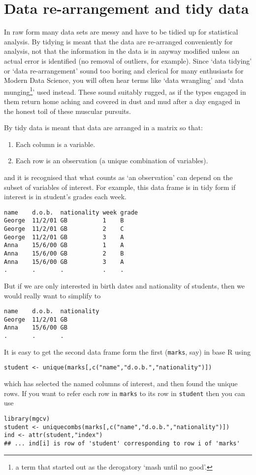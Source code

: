 \documentclass[10pt] {article}
\theoremstyle{definition}
\begin{document}
\section{Data re-arrangement and tidy data}

In raw form many data sets are messy and have to be tidied up for statistical analysis. By tidying is meant that the data are re-arranged conveniently for analysis, not that the information in the data is in anyway modified unless an actual error is identified (no removal of outliers, for example). Since `data tidying' or `data re-arrangement' sound too boring and clerical for many enthusiasts for Modern Data Science, you will often hear terms like `data wrangling' and `data munging\footnote{a term that started out as the derogatory `mash until no good'.}' used instead. These sound suitably rugged, as if the types engaged in them return home aching and covered in dust and mud after a day engaged in the honest toil of these muscular pursuits.

By tidy data is meant that data are arranged in a matrix so that:
\begin{enumerate}
\item Each column is a variable.
\item Each row is an observation (a unique combination of variables).
\end{enumerate}
and it is recognised that what counts as `an observation' can depend on the subset of variables of interest. For example,
this data frame is in tidy form if interest is in student's grades each week. 
\begin{verbatim}
name    d.o.b.  nationality week grade
George  11/2/01 GB          1    B
George  11/2/01 GB          2    C
George  11/2/01 GB          3    A
Anna    15/6/00 GB          1    A
Anna    15/6/00 GB          2    B
Anna    15/6/00 GB          3    A
.       .       .           .    .
\end{verbatim}
But if we are only interested in birth dates and nationality of students, then we would really want to simplify to
\begin{verbatim}
name    d.o.b.  nationality 
George  11/2/01 GB          
Anna    15/6/00 GB          
.       .       .           
\end{verbatim}
It is easy to get the second data frame form the first (\lstinline+marks+, say) in base R using
\begin{lstlisting}
student <- unique(marks[,c("name","d.o.b.","nationality")])
\end{lstlisting}
which has selected the named columns of interest, and then found the unique rows. If you want to refer each row in \lstinline+marks+ to its row in \lstinline+student+ then you can use 
\begin{lstlisting}
library(mgcv)
student <- uniquecombs(marks[,c("name","d.o.b.","nationality")])
ind <- attr(student,"index") 
## ... ind[i] is row of 'student' corresponding to row i of 'marks'
\end{lstlisting}
\end{document}
